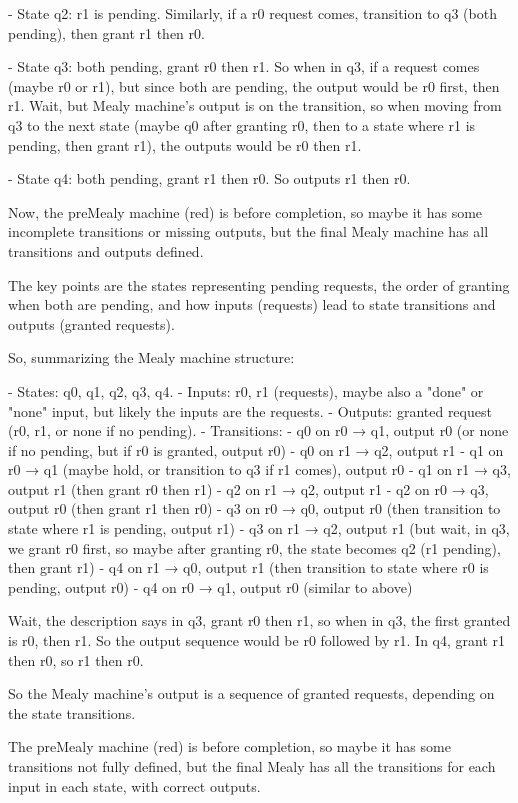 - State q2: r1 is pending. Similarly, if a r0 request comes, transition to q3 (both pending), then grant r1 then r0.

- State q3: both pending, grant r0 then r1. So when in q3, if a request comes (maybe r0 or r1), but since both are pending, the output would be r0 first, then r1. Wait, but Mealy machine's output is on the transition, so when moving from q3 to the next state (maybe q0 after granting r0, then to a state where r1 is pending, then grant r1), the outputs would be r0 then r1.

- State q4: both pending, grant r1 then r0. So outputs r1 then r0.

Now, the preMealy machine (red) is before completion, so maybe it has some incomplete transitions or missing outputs, but the final Mealy machine has all transitions and outputs defined.

The key points are the states representing pending requests, the order of granting when both are pending, and how inputs (requests) lead to state transitions and outputs (granted requests).

So, summarizing the Mealy machine structure:

- States: q0, q1, q2, q3, q4.
- Inputs: r0, r1 (requests), maybe also a "done" or "none" input, but likely the inputs are the requests.
- Outputs: granted request (r0, r1, or none if no pending).
- Transitions:
  - q0 on r0 → q1, output r0 (or none if no pending, but if r0 is granted, output r0)
  - q0 on r1 → q2, output r1
  - q1 on r0 → q1 (maybe hold, or transition to q3 if r1 comes), output r0
  - q1 on r1 → q3, output r1 (then grant r0 then r1)
  - q2 on r1 → q2, output r1
  - q2 on r0 → q3, output r0 (then grant r1 then r0)
  - q3 on r0 → q0, output r0 (then transition to state where r1 is pending, output r1)
  - q3 on r1 → q2, output r1 (but wait, in q3, we grant r0 first, so maybe after granting r0, the state becomes q2 (r1 pending), then grant r1)
  - q4 on r1 → q0, output r1 (then transition to state where r0 is pending, output r0)
  - q4 on r0 → q1, output r0 (similar to above)

Wait, the description says in q3, grant r0 then r1, so when in q3, the first granted is r0, then r1. So the output sequence would be r0 followed by r1. In q4, grant r1 then r0, so r1 then r0.

So the Mealy machine's output is a sequence of granted requests, depending on the state transitions.

The preMealy machine (red) is before completion, so maybe it has some transitions not fully defined, but the final Mealy has all the transitions for each input in each state, with correct outputs.

